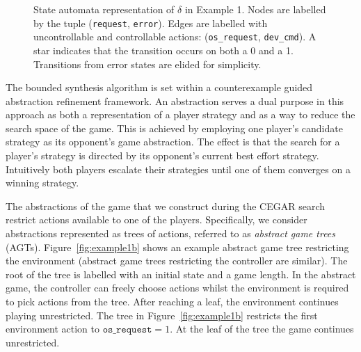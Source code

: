 \begin{figure}
    \centering
    \caption[State automata representation of example $\delta$.]{State automata representation of $\delta$ in Example 1. Nodes are labelled by the tuple (\texttt{request}, \texttt{error}). Edges are labelled with uncontrollable and controllable actions: (\texttt{os\_request}, \texttt{dev\_cmd}). A star indicates that the transition occurs on both a 0 and a 1. Transitions from error states are elided for simplicity.}
    \label{fig:example1}
\end{figure}

The bounded synthesis algorithm is set within a counterexample guided abstraction refinement framework. An abstraction serves a dual purpose in this approach as both a representation of a player strategy and as a way to reduce the search space of the game. This is achieved by employing one player's candidate strategy as its opponent's game abstraction. The effect is that the search for a player's strategy is directed by its opponent's current best effort strategy. Intuitively both players escalate their strategies until one of them converges on a winning strategy.

The abstractions of the game that we construct during the CEGAR search restrict actions available to one of the players.  Specifically, we consider abstractions represented as trees of actions, referred to as \emph{abstract game trees} (AGTs).  Figure~\ref{fig:example1b} shows an example abstract game tree restricting the environment (abstract game trees restricting the controller are similar).  The root of the tree is labelled with an initial state and a game length.  In the abstract game, the controller can freely choose actions whilst the environment is required to pick actions from the tree.  After reaching a leaf, the environment continues playing unrestricted.  The tree in Figure~\ref{fig:example1b} restricts the first environment action to $\texttt{os\_request} = 1$. At the leaf of the tree the game continues unrestricted.

